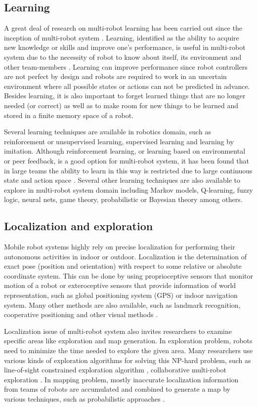 \subsection*{Learning}
\label{bg:mrs:learn}
A great deal of research on multi-robot learning has been carried out since the inception of multi-robot system \cite{Mataric+2001,Parker1995}. Learning, identified as the ability to acquire new knowledge or skills and improve one's performance, is useful in multi-robot system due to the necessity of robot to know about itself, its environment and other team-members \cite{Mataric2007}. Learning can improve performance since robot controllers are not perfect by design and robots are required to work in an uncertain environment where all possible states or actions can not be predicted in advance. Besides learning, it is also important to forget learned things that are no longer needed (or correct) as well as to make room for new things to be learned and stored in a finite memory space of a robot. 

Several learning techniques are available in robotics domain, such as reinforcement or unsupervised learning, supervised learning and learning by imitation. Although reinforcement learning, or learning based on environmental or peer feedback, is a good option for multi-robot system, it has been found that in large teams the ability to learn in this way is restricted due to large continuous state and action space \cite{Yang+2004}. Several other learning techniques are also available to explore in multi-robot system domain including Markov models, Q-learning, fuzzy logic, neural nets, game theory, probabilistic or Bayesian theory among others. 
\subsection*{Localization and exploration}
\label{bg:mrs:loc}
Mobile robot systems highly rely on precise localization for performing their autonomous activities in indoor or outdoor. Localization is the determination of exact pose (position and orientation) with respect to some relative or absolute coordinate system. This can be done by using proprioceptive sensors that monitor motion of a robot or exteroceptive sensors that provide information of world representation, such as  global positioning system (GPS) or indoor navigation system. Many other methods are also available, such as landmark recognition, cooperative positioning and other visual methods \cite{Arkin+2002}.

Localization issue of multi-robot system also invites researchers to examine specific areas like exploration and map generation. In exploration problem, robots need to minimize the time needed to explore the given area. Many researchers use various kinds of exploration algorithms for solving this NP-hard problem, such as line-of-sight constrained exploration algorithm , collaborative multi-robot exploration \cite{Burgard+2000}. In mapping problem, mostly inaccurate localization information from teams of robots are accumulated and combined to generate a map by various techniques, such as probabilistic approaches \cite{Thurn+2000}.
